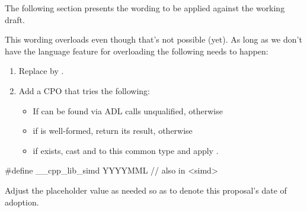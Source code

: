 The following section presents the wording to be applied against the \CC{}
working draft.

This wording overloads  even though that's not possible (yet).
As long as we don't have the language feature for overloading  the following needs to happen:
\begin{enumerate}
  \item Replace  by .
  \item Add a \std{} CPO that tries the following:
    \begin{itemize}
      \item If  can be found via ADL calls  unqualified, otherwise
      \item if  is well-formed, return its result, otherwise
      \item if  exists, cast  and  to this common type and apply .
    \end{itemize}
\end{enumerate}

\begin{wgText}
  \begin{codeblock}
    #define __cpp_lib_simd YYYYMML // also in <simd>
  \end{codeblock}
\end{wgText}
Adjust the placeholder value as needed so as to denote this proposal's date of adoption.

\begin{wgText}
  \setcounter{WGClause}{28}
  \setcounter{WGSubSection}{8}
  
\end{wgText}


